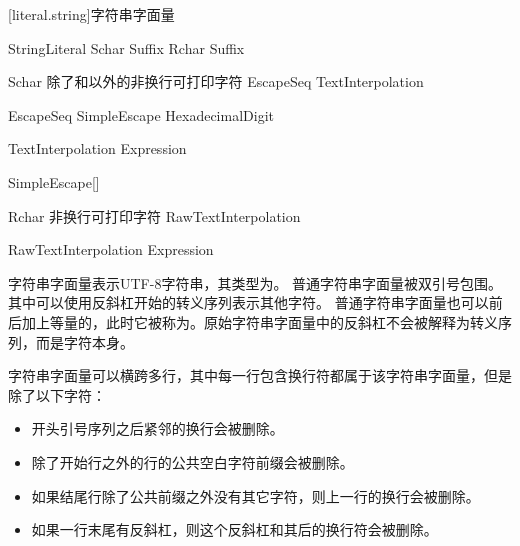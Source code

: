 [literal.string]{字符串字面量}

\begin{bnf}{StringLiteral}
     Schar\bnfs {} Suffix\bnfq \br
    \bnfp {} Rchar\bnfs {} \bnfp Suffix\bnfq
\end{bnf}

\begin{bnf}{Schar}
    \textnormal{除了\terminal{\textbackslash}和以外的非换行可打印字符} \br
    EscapeSeq \br
    TextInterpolation
\end{bnf}

\begin{bnf}{EscapeSeq}
    \terminal{\textbackslash} SimpleEscape \br
     HexadecimalDigit\bnfp \terminal{\}}
\end{bnf}

\begin{bnf}{TextInterpolation}
    \terminal{\textbackslash{}(} Expression \terminal{)}
\end{bnf}

\begin{bnf}{SimpleEscape}[\oneof]
\end{bnf}

\begin{bnf}{Rchar}
    \textnormal{非换行可打印字符} \br
    RawTextInterpolation
\end{bnf}

\begin{bnf}{RawTextInterpolation}
    \terminal{\textbackslash} \bnfp \terminal{(}  Expression \terminal{)}
\end{bnf}

\pnum
字符串字面量表示UTF-8字符串，其类型为。
普通字符串字面量被双引号包围。其中可以使用反斜杠开始的转义序列表示其他字符。
普通字符串字面量也可以前后加上等量的，此时它被称为。原始字符串字面量中的反斜杠不会被解释为转义序列，而是字符本身。

\pnum
字符串字面量可以横跨多行，其中每一行包含换行符都属于该字符串字面量，但是除了以下字符：

\begin{itemize}
    \item 开头引号序列之后紧邻的换行会被删除。
    \item 除了开始行之外的行的公共空白字符前缀会被删除。
    \item 如果结尾行除了公共前缀之外没有其它字符，则上一行的换行会被删除。
    \item 如果一行末尾有反斜杠，则这个反斜杠和其后的换行符会被删除。
\end{itemize}

